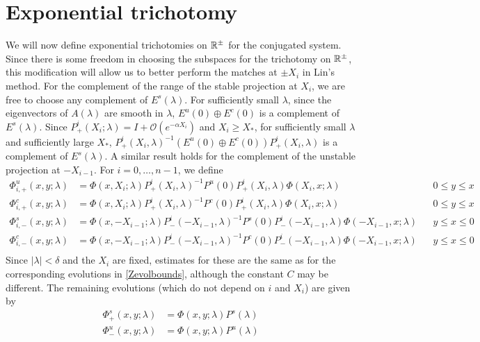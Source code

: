 \documentclass[thesis.tex]{subfiles}
\begin{document}
\section{Exponential trichotomy}\label{sec:trichotomy}

We will now define exponential trichotomies on $\mathbb{R}^\pm$ for the conjugated system. Since there is some freedom in choosing the subspaces for the trichotomy on $\mathbb{R}^\pm$, this modification will allow us to better perform the matches at $\pm X_i$ in Lin's method. For the complement of the range of the stable projection at $X_i$, we are free to choose any complement of $E^s(\lambda)$. For sufficiently small $\lambda$, since the eigenvectors of $A(\lambda)$ are smooth in $\lambda$, $E^u(0)\oplus E^c(0)$ is a complement of $E^s(\lambda)$. Since $P^i_+(X_i; \lambda) = I + \mathcal{O}(e^{-\alpha X_i})$ and $X_i \geq X_*$, for sufficiently small $\lambda$ and sufficiently large $X_*$, $P^i_+(X_i, \lambda)^{-1} ( E^u(0)\oplus E^c(0) ) P^i_+(X_i, \lambda)$ is a complement of $E^s(\lambda)$. A similar result holds for the complement of the unstable projection at $-X_{i-1}$. For $i = 0, \dots, n-1$, we define
\begin{equation}\label{Zevolmod}
\begin{aligned}
\Phi^u_{i,+}(x, y; \lambda) &= \Phi(x, X_i; \lambda) P^i_+(X_i, \lambda)^{-1}
P^u(0) P^i_+(X_i, \lambda) \Phi(X_i, x; \lambda) && 0 \leq y \leq x \\
\Phi^c_{i,+}(x, y; \lambda) &= \Phi(x, X_i; \lambda) P^i_+(X_i, \lambda)^{-1}
P^c(0) P^i_+(X_i, \lambda) \Phi(X_i, x; \lambda) && 0 \leq y \leq x \\
\Phi^s_{i,-}(x, y; \lambda) &= \Phi(x, -X_{i-1}; \lambda) P^i_-(-X_{i-1}, \lambda)^{-1}
P^s(0) P^i_-(-X_{i-1}, \lambda) \Phi(-X_{i-1}, x; \lambda) && y \leq x \leq 0 \\
\Phi^c_{i,-}(x, y; \lambda) &= \Phi(x, -X_{i-1}; \lambda) P^i_-(-X_{i-1}, \lambda)^{-1}
P^c(0) P^i_-(-X_{i-1}, \lambda) \Phi(-X_{i-1}, x; \lambda) && y \leq x \leq 0 \\
\end{aligned}
\end{equation}
Since $|\lambda| < \delta$ and the $X_i$ are fixed, estimates for these are the same as for the corresponding evolutions in \cref{Zevolbounds}, although the constant $C$ may be different. The remaining evolutions (which do not depend on $i$ and $X_i$) are given by
\begin{equation}\label{Zevolrest}
\begin{aligned}
\Phi^s_+(x, y; \lambda) &= \Phi(x, y; \lambda) P^s(\lambda) \\
\Phi^u_-(x, y; \lambda) &= \Phi(x, y; \lambda) P^u(\lambda)
\end{aligned}
\end{equation}
\end{document}
